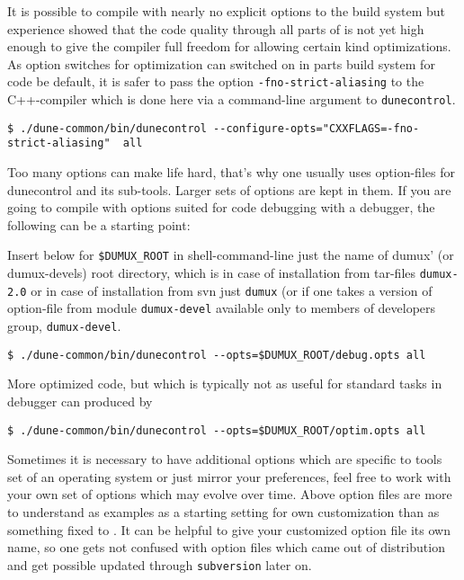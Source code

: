 It is possible to compile \Dumux with nearly no explicit options to the build system but
experience showed that the code quality through all parts of \Dune is not yet high enough to give the compiler full freedom for allowing certain kind optimizations. As option switches for optimization can switched on in parts build system for code be default, it is safer to pass the option \texttt{-fno-strict-aliasing} to the C++-compiler \cite{WIKIPED-ALIASING} which is done here via a command-line argument to \texttt{dunecontrol}.


\begin{lstlisting}[style=Bash]
$ ./dune-common/bin/dunecontrol --configure-opts="CXXFLAGS=-fno-strict-aliasing"  all
\end{lstlisting}

Too many options can make life hard, that's why one usually uses option-files for dunecontrol and its sub-tools.
Larger sets of options are kept in them. 
If you are going to compile with options suited for code debugging with a debugger, the following
can be a starting point:

Insert below for \verb+$DUMUX_ROOT+ in shell-command-line just the name of dumux' (or dumux-devels) root directory, which is in case of installation from tar-files \texttt{dumux-2.0} or in case of installation from svn just \texttt{dumux} (or if one takes a version of option-file from module \texttt{dumux-devel} available only to members of \Dumux developers group, \texttt{dumux-devel}.

\begin{lstlisting}[style=Bash]
$ ./dune-common/bin/dunecontrol --opts=$DUMUX_ROOT/debug.opts all
\end{lstlisting}

More optimized code, but which is typically not as useful for standard tasks in debugger can produced by 

\begin{lstlisting}[style=Bash]
$ ./dune-common/bin/dunecontrol --opts=$DUMUX_ROOT/optim.opts all
\end{lstlisting}

Sometimes it is necessary to have additional options which are specific to tools set of an operating system or just mirror your preferences, feel free to work with your own set of options which may evolve over time. Above option files are more to understand as examples as a starting setting for own customization than as something fixed to \Dumux.
It can be helpful to give your customized option file its own name, so one gets not confused with option files which came out of distribution and get possible updated through \texttt{subversion} later on.

